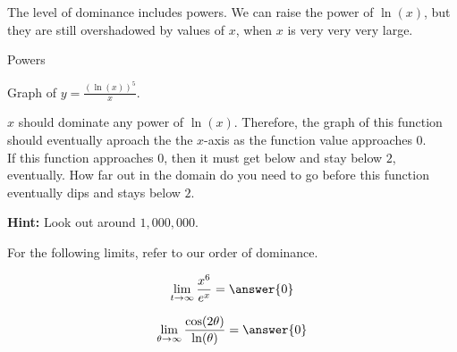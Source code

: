 \documentclass{ximera}
\begin{document}
The level of dominance includes powers.  We can raise the power of $\ln(x)$, but they are still overshadowed by values of $x$, when $x$ is very very very large. \\

















\begin{example} Powers


Graph of $y = \frac{(\ln(x))^5}{x}$.

$x$ should dominate any power of $\ln(x)$.  Therefore, the graph of this function should eventually aproach the the $x$-axis as the function value approaches $0$. \\


If this function approaches $0$, then it must get below and stay below $2$, eventually. How far out in the domain do you need to go before this function eventually dips and stays below $2$.


\begin{center}
\end{center}




\textbf{Hint:} Look out around $1,000,000$.

\end{example}







For the following limits, refer to our order of dominance.

\begin{question}

\[
\lim\limits_{t \to \infty} \frac{x^6}{e^x} = \answer{0}
\]

\end{question}









\begin{question}

\[
\lim\limits_{\theta \to \infty} \frac{\cos(2 \theta)}{\ln(\theta)} = \answer{0}
\]

\end{question}
\end{document}
